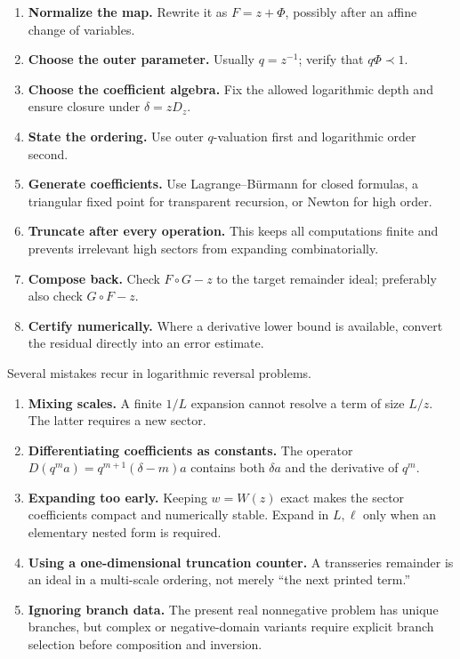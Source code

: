 \documentclass[11pt]{article}
\theoremstyle{clean}
\begin{document}
\begin{methodbox}
\begin{enumerate}[leftmargin=2em]
\item \textbf{Normalize the map.}  Rewrite it as \(F=z+\Phi\), possibly after
an affine change of variables.
\item \textbf{Choose the outer parameter.}  Usually \(q=z^{-1}\); verify that
\(q\Phi\prec1\).
\item \textbf{Choose the coefficient algebra.}  Fix the allowed logarithmic
depth and ensure closure under \(\delta=zD_z\).
\item \textbf{State the ordering.}  Use outer \(q\)-valuation first and
logarithmic order second.
\item \textbf{Generate coefficients.}  Use Lagrange--B\"urmann for closed
formulas, a triangular fixed point for transparent recursion, or Newton for
high order.
\item \textbf{Truncate after every operation.}  This keeps all computations
finite and prevents irrelevant high sectors from expanding combinatorially.
\item \textbf{Compose back.}  Check \(F\circ G-z\) to the target remainder
ideal; preferably also check \(G\circ F-z\).
\item \textbf{Certify numerically.}  Where a derivative lower bound is
available, convert the residual directly into an error estimate.
\end{enumerate}
\end{methodbox}

Several mistakes recur in logarithmic reversal problems.

\begin{enumerate}[label=\textbf{P\arabic*.},leftmargin=2.5em]
\item \textbf{Mixing scales.}  A finite \(1/L\) expansion cannot resolve a
term of size \(L/z\).  The latter requires a new sector.
\item \textbf{Differentiating coefficients as constants.}  The operator
\(D(q^m a)=q^{m+1}(\delta-m)a\) contains both \(\delta a\) and the derivative
of \(q^m\).
\item \textbf{Expanding too early.}  Keeping \(w=W(z)\) exact makes the sector
coefficients compact and numerically stable.  Expand in \(L,\ell\) only when
an elementary nested form is required.
\item \textbf{Using a one-dimensional truncation counter.}  A transseries
remainder is an ideal in a multi-scale ordering, not merely ``the next printed
term.''
\item \textbf{Ignoring branch data.}  The present real nonnegative problem has
unique branches, but complex or negative-domain variants require explicit
branch selection before composition and inversion.
\end{enumerate}
\end{document}
